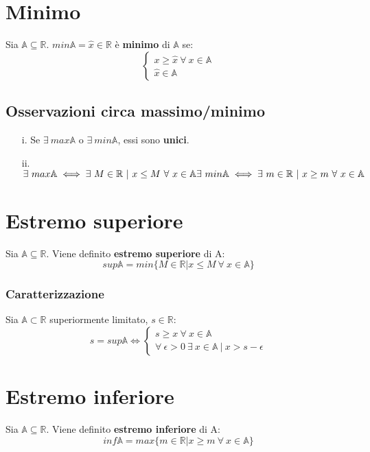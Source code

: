 \section{Minimo}
Sia $\mathbb{A} \subseteq \mathbb{R}$. $min\mathbb{A}=\hat{x} \in \mathbb{R}$ è \textbf{minimo} di $\mathbb{A}$ se:
\begin{equation}
\begin{cases}
x \geq \hat{x}\ \forall\ x \in \mathbb{A}\\
\hat{x} \in \mathbb{A}
\end{cases}
\end{equation}
\subsection{Osservazioni circa massimo/minimo}
\begin{enumerate}
\item [i.] Se $\exists\ max\mathbb{A}$ o $\exists\ min\mathbb{A}$, essi sono \textbf{unici}.
\item [ii.] $\exists\ max\mathbb{A} \iff \exists\ M \in \mathbb{R}\ |\ x \leq M\ \forall\ x \in \mathbb{A}\\
\exists\ min\mathbb{A} \iff \exists\ m \in \mathbb{R}\ |\ x \geq m\ \forall\ x \in \mathbb{A}$
\end{enumerate}
\section{Estremo superiore}
Sia $\mathbb{A} \subseteq \mathbb{R}$. Viene definito \textbf{estremo superiore} di A:
\begin{equation}
sup\mathbb{A} = min\{M \in \mathbb{R} | x \leq M\ \forall\ x \in \mathbb{A}\}
\end{equation}
\subsubsection{Caratterizzazione}
Sia $\mathbb{A} \subset \mathbb{R}$ superiormente limitato, $s \in \mathbb{R}$:\\
\begin{equation}
	s=sup\mathbb{A} \iff
	\begin{cases}
	s \geq x\ \forall\ x \in \mathbb{A}\\
	\forall\ \epsilon > 0\ \exists\ x \in \mathbb{A}\ |\ x > s-\epsilon
	\end{cases}
\end{equation}
\section{Estremo inferiore}
Sia $\mathbb{A} \subseteq \mathbb{R}$. Viene definito \textbf{estremo inferiore} di A:
\begin{equation}
inf\mathbb{A} = max\{m \in \mathbb{R} | x \geq m\ \forall\ x \in \mathbb{A}\}
\end{equation}
